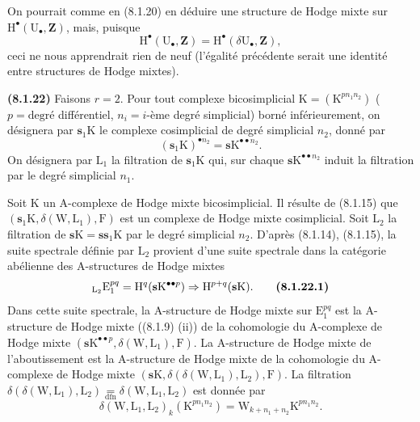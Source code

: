 \documentclass[11pt,leqno]{article}
\begin{document}
On pourrait comme en (8.1.20) en déduire une structure de Hodge mixte sur \(\mathrm{H}^{\bullet}(\mathrm{U}_{\bullet},\mathbf{Z})\), mais, puisque
\[
\mathrm{H}^{\bullet}(\mathrm{U}_{\bullet},\mathbf{Z})
=
\mathrm{H}^{\bullet}(\delta\mathrm{U}_{\bullet},\mathbf{Z}),
\]
ceci ne nous apprendrait rien de neuf (l’égalité précédente serait une identité entre structures de Hodge mixtes).

\textbf{(8.1.22)} Faisons \(r=2\). Pour tout complexe bicosimplicial \(\mathrm{K}=(\mathrm{K}^{p n_{1} n_{2}})\) (\(p=\text{degré}\) différentiel, \(n_i=i\)-ème degré simplicial) borné inférieurement, on désignera par \(\mathbf{s}_{1}\mathrm{K}\) le complexe cosimplicial de degré simplicial \(n_{2}\), donné par
\[
(\mathbf{s}_{1}\mathrm{K})^{\bullet n_{2}}
=
\mathbf{s}\mathrm{K}^{\bullet\bullet n_{2}}.
\]
On désignera par \(\mathrm{L}_{1}\) la filtration de \(\mathbf{s}_{1}\mathrm{K}\) qui, sur chaque \(\mathbf{s}\mathrm{K}^{\bullet\bullet n_{2}}\) induit la filtration par le degré simplicial \(n_{1}\).

Soit \(\mathrm{K}\) un \(\mathrm{A}\)-complexe de Hodge mixte bicosimplicial. Il résulte de (8.1.15) que \((\mathbf{s}_{1}\mathrm{K},\delta(\mathrm{W},\mathrm{L}_{1}),\mathrm{F})\) est un complexe de Hodge mixte cosimplicial. Soit \(\mathrm{L}_{2}\) la filtration de \(\mathbf{s}\mathrm{K}=\mathbf{s}\mathbf{s}_{1}\mathrm{K}\) par le degré simplicial \(n_{2}\). D’après (8.1.14), (8.1.15), la suite spectrale définie par \(\mathrm{L}_{2}\) provient d’une suite spectrale dans la catégorie abélienne des \(\mathrm{A}\)-structures de Hodge mixtes
\[
{}_{\mathrm{L}_{2}}\mathrm{E}_{1}^{pq}
=
\mathrm{H}^{q}(\mathbf{s}\mathrm{K}^{\bullet\bullet p})
\Rightarrow
\mathrm{H}^{p+q}(\mathbf{s}\mathrm{K}).
\tag*{\textbf{(8.1.22.1)}}
\]
Dans cette suite spectrale, la \(\mathrm{A}\)-structure de Hodge mixte sur \(\mathrm{E}_{1}^{pq}\) est la \(\mathrm{A}\)-structure de Hodge mixte ((8.1.9) (ii)) de la cohomologie du \(\mathrm{A}\)-complexe de Hodge mixte \((\mathbf{s}\mathrm{K}^{\bullet\bullet p},\delta(\mathrm{W},\mathrm{L}_{1}),\mathrm{F})\). La \(\mathrm{A}\)-structure de Hodge mixte de l’aboutissement est la \(\mathrm{A}\)-structure de Hodge mixte de la cohomologie du \(\mathrm{A}\)-complexe de Hodge mixte \((\mathbf{s}\mathrm{K},\delta(\delta(\mathrm{W},\mathrm{L}_{1}),\mathrm{L}_{2}),\mathrm{F})\). La filtration \(\delta(\delta(\mathrm{W},\mathrm{L}_{1}),\mathrm{L}_{2})\underset{\mathrm{dfn}}{=}\delta(\mathrm{W},\mathrm{L}_{1},\mathrm{L}_{2})\) est donnée par
\[
\delta(\mathrm{W},\mathrm{L}_{1},\mathrm{L}_{2})_{k}
(\mathrm{K}^{p n_{1} n_{2}})
=
\mathrm{W}_{k+n_{1}+n_{2}}\mathrm{K}^{p n_{1} n_{2}}.
\]
\end{document}
